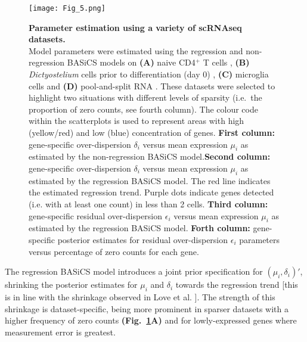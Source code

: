 \newpage

\begin{figure}[!h]
\centering
\texttt{[image: Fig\_5.png]}
\caption{\textbf{Parameter estimation using a variety of scRNAseq datasets.}\\
Model parameters were estimated using the regression and non-regression BASiCS models on \textbf{(A)} naive CD4$^+$ T cells \citep{Martinez-jimenez2017}, \textbf{(B)} \textit{Dictyostelium} cells prior to differentiation (day 0) \citep{Antolovic2017}, \textbf{(C)} microglia cells \citep{Zeisel2015} and \textbf{(D)} pool-and-split RNA \citep{Grun2014}. These datasets were selected to highlight two situations with different levels of sparsity (i.e.~the proportion of zero counts, see fourth column). The colour code within the scatterplots is used to represent areas with high (yellow/red) and low (blue) concentration of genes. \textbf{First column:} gene-specific over-dispersion $\delta_i$ versus mean expression $\mu_i$ as estimated by the non-regression BASiCS model.\textbf{Second column:} gene-specific over-dispersion $\delta_i$ versus mean expression $\mu_i$ as estimated by the regression BASiCS model. The red line indicates the estimated regression trend. Purple dots indicate genes detected (i.e. with at least one count) in less than 2 cells. \textbf{Third column:} gene-specific residual over-dispersion $\epsilon_i$ versus mean expression $\mu_i$ as estimated by the regression BASiCS model. \textbf{Forth column:} gene-specific posterior estimates for residual over-dispersion $\epsilon_i$ parameters versus percentage of zero counts for each gene.\\}
\label{fig2:datasets}
\end{figure}

\newpage

The regression BASiCS model introduces a joint prior specification for $(\mu_i, \delta_i)'$, shrinking the posterior estimates for $\mu_i$ and $\delta_i$ towards the regression trend [this is in line with the shrinkage observed in Love et al. \citep{Love2014}]. The strength of this shrinkage is dataset-specific, being more prominent in sparser datasets with a higher frequency of zero counts \textbf{(Fig.~\ref{fig2:datasets}A)} and for lowly-expressed genes where measurement error is greatest. \\

